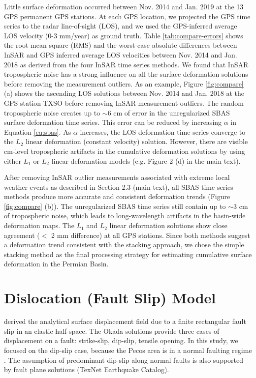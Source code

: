 \documentclass[draft,grl]{agutexSI2019}
\begin{document}
\begin{article}
Little surface deformation occurred between Nov. 2014 and Jan. 2019 at the 13 GPS permanent GPS stations. At each GPS location, we projected the GPS time series to the radar line-of-sight (LOS), and we used the GPS-inferred average LOS velocity (0-3 mm/year) as ground truth. Table \ref{tab:compare-errors} shows the root mean square (RMS) and the worst-case absolute differences between InSAR and GPS inferred average LOS velocities between Nov. 2014 and Jan. 2018 as derived from the four InSAR time series methods. We found that InSAR tropospheric noise has a strong influence on all the surface deformation solutions before removing the measurement outliers. As an example, Figure \ref{fig:compare} (a) shows the ascending LOS solutions between Nov. 2014 and Jan. 2018 at the GPS station TXSO before removing InSAR measurement outliers. The random tropospheric noise creates up to $\sim$6 cm of error in the unregularized SBAS surface deformation time series. This error can be reduced by increasing $ \alpha$ in Equation \eqref{eq:sbas}. As $\alpha$ increases, the LOS deformation time series converge to the $L_2$ linear deformation (constant velocity) solution. However, there are visible cm-level tropospheric artifacts in the cumulative deformation solutions by using either $L_1$ or $L_2$ linear deformation models (e.g. Figure 2 (d) in the main text). 

After removing InSAR outlier measurements associated with extreme local weather events as described in Section 2.3 (main text), all SBAS time series methods produce more accurate and consistent deformation trends (Figure \ref{fig:compare} (b)). The unregularized SBAS time series still contain up to $\sim$3 cm of tropospheric noise, which leads to long-wavelength artifacts in the basin-wide deformation maps. The $ L_1 $ and $ L_2 $ linear deformation solutions show close agreement ($<$ 2 mm difference) at all GPS stations. Since both methods suggest a deformation trend consistent with the stacking approach, we chose the simple stacking method as the final processing strategy for estimating cumulative surface deformation in the Permian Basin.


\section{ Dislocation (Fault Slip) Model}
 derived the analytical surface displacement field due to a finite rectangular fault slip in an elastic half-space. The Okada solutions provide three cases of displacement on a fault: strike-slip, dip-slip, tensile opening. In this study, we focused on the dip-slip case, because the Pecos area is in a normal faulting regime \cite{LundSnee2018}.  The assumption of predominant dip-slip along normal faults is also supported by fault plane solutions (TexNet Earthquake Catalog). 


\end{article}
\end{document}
